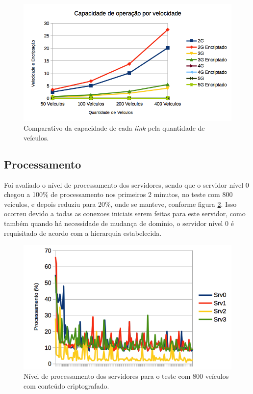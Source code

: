 \documentclass[
	12pt,				%
	oneside,			%
	a4paper,			%
	english,			%
	brazil				%
	]{abntex2ppgsi}
\begin{document}
\begin{figure}[h!]
	\centering
	\includegraphics[width=0.7\columnwidth]{images/capacidadeLink.png}
	\caption{Comparativo da capacidade de cada \textit{link} pela quantidade de veículos.}
	\label{fig:graficotaxatransferencia}
\end{figure}


\subsection{Processamento}

Foi avaliado o nível de processamento dos servidores, sendo que o servidor nível 0 chegou a 100\% de processamento nos primeiros 2 minutos, no teste com 800 veículos, e depois reduziu para 20\%, onde se manteve, conforme figura  \ref{fig:processamento800}. Isso ocorreu devido a todas as conexoes iniciais serem feitas para este servidor, como também quando há necessidade de mudança de domínio, o servidor nível 0 é requisitado de acordo com a hierarquia estabelecida. 

\begin{figure}[h!]
	\centering
	\includegraphics[width=0.7\columnwidth]{images/processamento1.png}
	\caption{Nível de processamento dos servidores para o teste com 800 veículos com conteúdo criptografado.}
	\label{fig:processamento800}
\end{figure}
\end{document}
